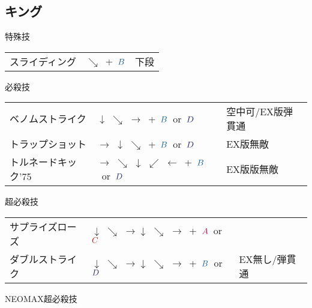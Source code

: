 \documentclass[a4j,11pt]{jarticle}
\def\A{$\textcolor{Acolor}{A}$}
\def\C{$\textcolor{Ccolor}{C}$}
\def\B{$\textcolor{Bcolor}{B}$}
\def\D{$\textcolor{Dcolor}{D}$}
\def\hado{$\downarrow$ $\searrow$ $\rightarrow$}%
\def\tatsu{$\downarrow$ $\swarrow$ $\leftarrow$}%
\def\syoryu{$\rightarrow$ $\downarrow$ $\searrow$}%
\def\gyakuyoga{$\rightarrow$ $\searrow$ $\downarrow$ $\swarrow$ $\leftarrow$}%
\begin{document}
\subsection{キング}
\begin{itembox}[l]{特殊技}
\begin{tabular}{lll}
スライディング&$\searrow$\ +\ \B&下段%
\end{tabular}
\end{itembox}
\begin{itembox}[l]{必殺技}
\begin{tabular}{lll}
ベノムストライク&\hado\ +\ \B\ or\ \D&空中可/EX版弾貫通\\%
トラップショット&\syoryu\ +\ \B\ or\ \D&EX版無敵\\%
トルネードキック'75&\gyakuyoga\ +\ \B\ or\ \D&EX版版無敵%
\end{tabular}
\end{itembox}
\begin{itembox}[l]{超必殺技}
\begin{tabular}{lll}
サプライズローズ&\hado\hado\ +\ \A\ or\ \C&\\%
ダブルストライク&\hado\hado\ +\ \B\ or\ \D&EX無し/弾貫通%
\end{tabular}
\end{itembox}
\begin{itembox}[l]{NEOMAX超必殺技}
\end{itembox}
\newpage
\end{document}
